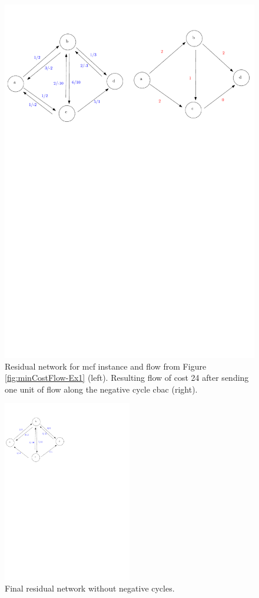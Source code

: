 \documentclass{article}
\begin{document}
\begin{figure}
\includegraphics[width=\textwidth]{Figs/minCostFlow-Ex1-residual}
\caption{Residual network for mcf instance and flow from Figure \ref{fig:minCostFlow-Ex1} (left). Resulting flow of cost 24 after sending one unit of flow along the negative cycle cbac (right).}\label{fig:minCostFlow-Ex1-residual}
\end{figure}

\begin{figure}
\includegraphics[width=0.5\textwidth]{Figs/minCostFlow-Ex1-residual2}
\caption{Final residual network without negative cycles.}\label{fig:minCostFlow-Ex1-residual2}
\end{figure}
\end{document}
